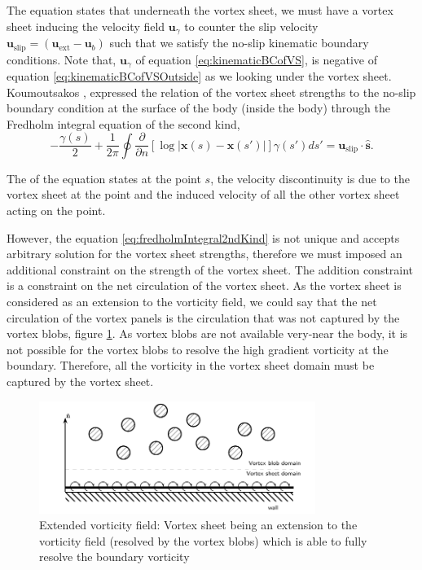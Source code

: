 The equation states that underneath the vortex sheet, we must have a vortex sheet inducing the velocity field $\mathbf{u}_{\gamma}$ to counter the slip velocity $\mathbf{u}_{\mathrm{slip}} = \left(\mathbf{u}_{\mathrm{ext}} - \mathbf{u}_b\right)$ such that we satisfy the no-slip kinematic boundary conditions. Note that, $\mathbf{u}_{\gamma}$ of equation \ref{eq:kinematicBCofVS}, is negative of equation \ref{eq:kinematicBCofVSOutside} as we looking under the vortex sheet. Koumoutsakos \cite{Koumoutsakos1993b}, expressed the relation of the vortex sheet strengths to the no-slip boundary condition at the surface of the body (inside the body) through the Fredholm integral equation of the second kind,
	\begin{equation}
	-\frac{\gamma\left(s\right)}{2} + \frac{1}{2\pi}\oint\frac{\partial}{\partial n}\left[\log\left|\mathbf{x}\left(s\right)-\mathbf{x}\left(s'\right)\right|\right]\gamma\left(s'\right)ds'= \mathbf{u}_{\mathrm{slip}}\cdot\mathbf{\hat{s}}.
	\label{eq:fredholmIntegral2ndKind}
	\end{equation}
		
The  of the equation states at the point $s$, the velocity discontinuity is due to the vortex sheet at the point and the induced velocity of all the other vortex sheet acting on the point. 

However, the equation \ref{eq:fredholmIntegral2ndKind} is not unique and accepts arbitrary solution for the vortex sheet strengths, therefore we must imposed an additional constraint on the strength of the vortex sheet. The addition constraint is a constraint on the net circulation of the vortex sheet. As the vortex sheet is considered as an extension to the vorticity field, we could say that the net circulation of the vortex panels	is the circulation that was not captured by the vortex blobs, figure \ref{fig:extendedVorticityField}. As vortex blobs are not available very-near the body, it is not possible for the vortex blobs to resolve the high gradient vorticity at the boundary. Therefore, all the vorticity in the vortex sheet domain must be captured by the vortex sheet.
	
	\begin{figure}[t]
	\centering
	\includegraphics[width=0.8\textwidth]{figures/lagrangian/extendedVorticityField.pdf}
	\caption{Extended vorticity field: Vortex sheet being an extension to the vorticity field (resolved by the vortex blobs) which is able to fully resolve the boundary vorticity}
	\label{fig:extendedVorticityField}
	\end{figure}	
	
